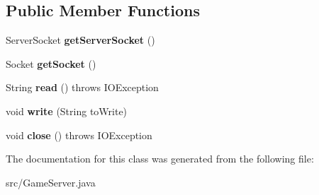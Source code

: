 \subsection*{Public Member Functions}
\begin{DoxyCompactItemize}
\item 
Server\+Socket {\bfseries get\+Server\+Socket} ()\hypertarget{classGameServer_a21aa851ead251173e7989c2a2fed0482}{}\label{classGameServer_a21aa851ead251173e7989c2a2fed0482}

\item 
Socket {\bfseries get\+Socket} ()\hypertarget{classGameServer_a7432bdbfdab3b4de5b087ccc7ec0d6c0}{}\label{classGameServer_a7432bdbfdab3b4de5b087ccc7ec0d6c0}

\item 
String {\bfseries read} ()  throws I\+O\+Exception \hypertarget{classGameServer_adc364b22489b8e52afe8697c5b92d10c}{}\label{classGameServer_adc364b22489b8e52afe8697c5b92d10c}

\item 
void {\bfseries write} (String to\+Write)\hypertarget{classGameServer_a7eb6fac8073558454fc9d4eb1ad78520}{}\label{classGameServer_a7eb6fac8073558454fc9d4eb1ad78520}

\item 
void {\bfseries close} ()  throws I\+O\+Exception \hypertarget{classGameServer_af368cef66168f8b95a11589c0809adfe}{}\label{classGameServer_af368cef66168f8b95a11589c0809adfe}

\end{DoxyCompactItemize}


The documentation for this class was generated from the following file\+:\begin{DoxyCompactItemize}
\item 
src/Game\+Server.\+java\end{DoxyCompactItemize}

